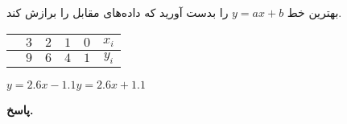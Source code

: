  بهترین خط 
 \(y=ax+b\)
 را بدست آورید که داده‌های مقابل را برازش کند.
 \vspace*{-.2cm}
	\begin{tabular}{ccccc|c}
		 & \(3\) &\(2\)&\(1\) & \(0\) & \(x_i\)\\
		\midrule
		& \(9\) & \(6\) & \(4\) &\( 1\) & \(y_i\)
	\end{tabular}
 {\(y=2.6x-1.1\)}{\(y=2.6x + 1.1\)}
\begin{answer}

	\textbf{پاسخ.}
	
\end{answer}
